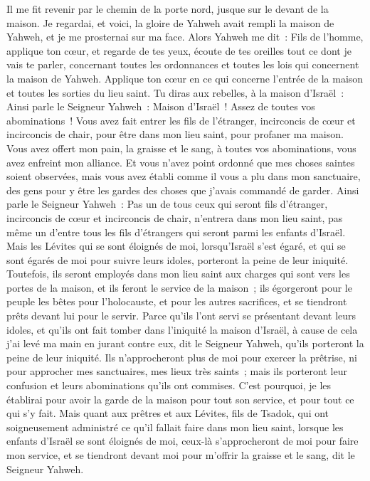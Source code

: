 \begin{multicols}{2}
Il me fit revenir par le chemin de la porte nord, jusque sur le devant de la maison. Je regardai, et voici, la gloire de Yahweh avait rempli la maison de Yahweh, et je me prosternai sur ma face.
Alors Yahweh me dit~: Fils de l'homme, applique ton cœur, et regarde de tes yeux, écoute de tes oreilles tout ce dont je vais te parler, concernant toutes les ordonnances et toutes les lois qui concernent la maison de Yahweh. Applique ton cœur en ce qui concerne l'entrée de la maison et toutes les sorties du lieu saint.
Tu diras aux rebelles, à la maison d'Israël~: Ainsi parle le Seigneur Yahweh~: Maison d'Israël~! Assez de toutes vos abominations~!
Vous avez fait entrer les fils de l'étranger, incirconcis de cœur et incirconcis de chair, pour être dans mon lieu saint, pour profaner ma maison. Vous avez offert mon pain, la graisse et le sang, à toutes vos abominations, vous avez enfreint mon alliance.
Et vous n'avez point ordonné que mes choses saintes soient observées, mais vous avez établi comme il vous a plu dans mon sanctuaire, des gens pour y être les gardes des choses que j'avais commandé de garder.
Ainsi parle le Seigneur Yahweh~: Pas un de tous ceux qui seront fils d'étranger, incirconcis de cœur et incirconcis de chair, n'entrera dans mon lieu saint, pas même un d'entre tous les fils d'étrangers qui seront parmi les enfants d'Israël.
Mais les Lévites qui se sont éloignés de moi, lorsqu'Israël s'est égaré, et qui se sont égarés de moi pour suivre leurs idoles, porteront la peine de leur iniquité.
Toutefois, ils seront employés dans mon lieu saint aux charges qui sont vers les portes de la maison, et ils feront le service de la maison~; ils égorgeront pour le peuple les bêtes pour l'holocauste, et pour les autres sacrifices, et se tiendront prêts devant lui pour le servir.
Parce qu'ils l'ont servi se présentant devant leurs idoles, et qu'ils ont fait tomber dans l'iniquité la maison d'Israël, à cause de cela j'ai levé ma main en jurant contre eux, dit le Seigneur Yahweh, qu'ils porteront la peine de leur iniquité.
Ils n'approcheront plus de moi pour exercer la prêtrise, ni pour approcher mes sanctuaires, mes lieux très saints~; mais ils porteront leur confusion et leurs abominations qu'ils ont commises.
C'est pourquoi, je les établirai pour avoir la garde de la maison pour tout son service, et pour tout ce qui s'y fait.
Mais quant aux prêtres et aux Lévites, fils de Tsadok, qui ont soigneusement administré ce qu'il fallait faire dans mon lieu saint, lorsque les enfants d'Israël se sont éloignés de moi, ceux-là s'approcheront de moi pour faire mon service, et se tiendront devant moi pour m'offrir la graisse et le sang, dit le Seigneur Yahweh.

\end{multicols}
